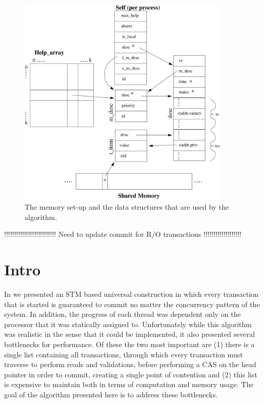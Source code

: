 \documentclass[runningheads,a4paper]{llncs}
\begin{document}
 
 
 
 

\begin{figure}[ht]
\centerline{
    \mbox{\includegraphics[width=0.9\textwidth]{stuff}}
}
\caption{The memory set-up and the data structures that are used by the 
algorithm.}
\label{fig:mem_setup}
\end{figure}
 
!!!!!!!!!!!!!!!!!!!!!!!!!! Need to update commit for R/O transactions !!!!!!!!!!!!!!!!!!!
 
\section{Intro}
In \cite{CIR12} we presented an STM based universal construction in which every transaction that is started is guaranteed to commit no matter the
concurrency pattern of the system.
In addition, the progress of each thread was dependent only on the processor that it was statically assigned to.
Unfortunately while this algorithm was realistic in the sense that it could be implemented, it also presented several bottlenecks
for performance.
Of these the two most important are (1) there is a single list containing all transactions, through which every transaction must
traverse to perform reads and validations, before performing a CAS on the head pointer in order to commit, creating a single point
of contention and (2) this list is expensive to maintain both in terms of computation and memory usage.
The goal of the algorithm presented here is to address these bottlenecks.
\end{document}
